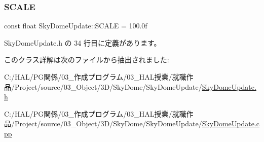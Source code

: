\subsubsection{\texorpdfstring{S\+C\+A\+LE}{SCALE}}
{\footnotesize\ttfamily const float Sky\+Dome\+Update\+::\+S\+C\+A\+LE = 100.\+0f\hspace{0.3cm}{\ttfamily [static]}}



 Sky\+Dome\+Update.\+h の 34 行目に定義があります。



このクラス詳解は次のファイルから抽出されました\+:\begin{DoxyCompactItemize}
\item 
C\+:/\+H\+A\+L/\+P\+G関係/03\+\_\+作成プログラム/03\+\_\+\+H\+A\+L授業/就職作品/\+Project/source/03\+\_\+\+Object/3\+D/\+Sky\+Dome/\+Sky\+Dome\+Update/\mbox{\hyperlink{_sky_dome_update_8h}{Sky\+Dome\+Update.\+h}}\item 
C\+:/\+H\+A\+L/\+P\+G関係/03\+\_\+作成プログラム/03\+\_\+\+H\+A\+L授業/就職作品/\+Project/source/03\+\_\+\+Object/3\+D/\+Sky\+Dome/\+Sky\+Dome\+Update/\mbox{\hyperlink{_sky_dome_update_8cpp}{Sky\+Dome\+Update.\+cpp}}\end{DoxyCompactItemize}
